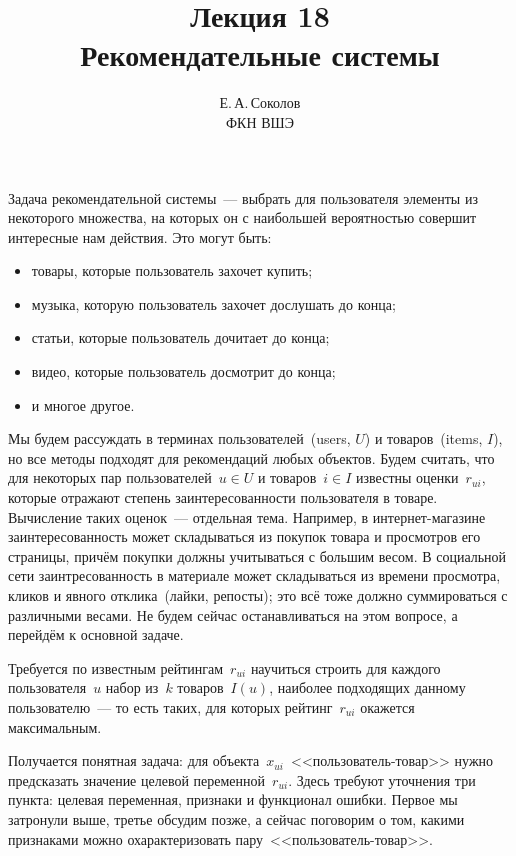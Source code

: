 \documentclass[12pt,fleqn]{article}
\begin{document}
\title{Лекция 18\\Рекомендательные системы}
\author{Е.\,А.\,Соколов\\ФКН ВШЭ}
\maketitle

Задача рекомендательной системы~--- выбрать для пользователя элементы из некоторого множества,
на которых он с наибольшей вероятностью совершит интересные нам действия.
Это могут быть:
\begin{itemize}
    \item товары, которые пользователь захочет купить;
    \item музыка, которую пользователь захочет дослушать до конца;
    \item статьи, которые пользователь дочитает до конца;
    \item видео, которые пользователь досмотрит до конца;
    \item и многое другое.
\end{itemize}

Мы будем рассуждать в терминах пользователей~(users, $U$) и товаров~(items, $I$),
но все методы подходят для рекомендаций любых объектов.
Будем считать, что для некоторых пар пользователей~$u \in U$ и товаров~$i \in I$ известны
оценки~$r_{ui}$, которые отражают степень заинтересованности пользователя в товаре.
Вычисление таких оценок~--- отдельная тема.
Например, в интернет-магазине заинтересованность может складываться из покупок товара
и просмотров его страницы, причём покупки должны учитываться с большим весом.
В социальной сети заинтресованность в материале может складываться из времени просмотра,
кликов и явного отклика~(лайки, репосты); это всё тоже должно суммироваться с различными весами.
Не будем сейчас останавливаться на этом вопросе, а перейдём к основной задаче.

Требуется по известным рейтингам~$r_{ui}$ научиться строить для каждого пользователя~$u$
набор из~$k$ товаров~$I(u)$, наиболее подходящих данному пользователю~--- то есть таких,
для которых рейтинг~$r_{ui}$ окажется максимальным.

Получается понятная задача: для объекта~$x_{ui}$~<<пользователь-товар>> нужно предсказать значение
целевой переменной~$r_{ui}$.
Здесь требуют уточнения три пункта: целевая переменная, признаки и функционал ошибки.
Первое мы затронули выше, третье обсудим позже, а сейчас поговорим о том,
какими признаками можно охарактеризовать пару~<<пользователь-товар>>.
\end{document}

